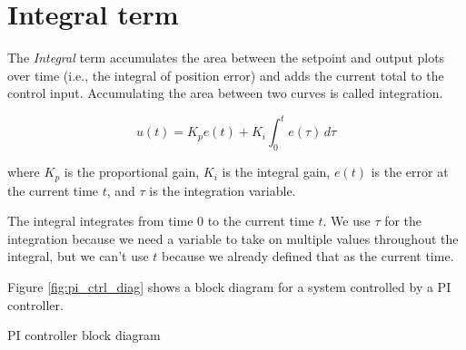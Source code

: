 \section{Integral term}

The \textit{Integral} term accumulates the area between the \gls{setpoint}
and \gls{output} plots over time (i.e., the integral of position \gls{error})
and adds the current total to the \gls{control input}. Accumulating the area
between two curves is called integration.
\begin{definition}[PI controller]
  \begin{equation}
    u(t) = K_p e(t) + K_i \int_0^t e(\tau) \,d\tau
  \end{equation}

  where $K_p$ is the proportional gain, $K_i$ is the integral gain, $e(t)$ is
  the error at the current time $t$, and $\tau$ is the integration variable.

  The integral integrates from time $0$ to the current time $t$. We use $\tau$
  for the integration because we need a variable to take on multiple values
  throughout the integral, but we can't use $t$ because we already defined that
  as the current time.
\end{definition}

Figure \ref{fig:pi_ctrl_diag} shows a block diagram for a \gls{system}
controlled by a PI controller.
\begin{bookfigure}

  \caption{PI controller block diagram}
  \label{fig:pi_ctrl_diag}
\end{bookfigure}


